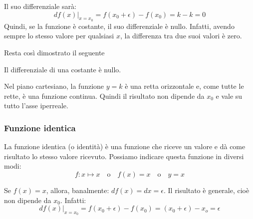 Il suo differenziale sarà:
\[df(x)|_{x=x_0}=f(x_0+\epsilon)-f(x_0)=k-k=0\]
Quindi, se la funzione è costante, il suo differenziale è nullo.
Infatti, avendo sempre lo stesso valore per qualsiasi \(x\), la differenza 
tra due suoi valori è zero. 

\begin{inaccessibleblock}
 \begin{center}
 \begin{minipage}[]{.38 \textwidth}
  \diffcostante
 \end{minipage} 
 \hfill
 \begin{minipage}[]{.58 \textwidth}
Resta così dimostrato il seguente   
\begin{teorema}
Il differenziale di una costante è nullo.
\end{teorema}
Nel piano cartesiano, la funzione  $y=k$ è una retta orizzontale e, come 
tutte le rette, è una funzione continua. Quindi il risultato non dipende da 
$x_0$ e vale su tutto l'asse iperreale.
 \end{minipage}
 \end{center}
\end{inaccessibleblock}

\label{fig:diff01_diffcostante}

\subsubsection{Funzione identica}
\label{subsubsec:diff01_diffidentica}

La funzione identica (o identità) è una funzione che riceve un valore e dà 
come risultato lo stesso valore ricevuto. Possiamo indicare questa funzione 
in diversi modi:
\[f: x \mapsto x \quad \text{o} \quad f(x)=x \quad \text{o} \quad y = x\]

Se $f(x)=x$, allora, banalmente: $df(x)=dx=\epsilon$. Il risultato è
generale, cioè non dipende da $x_0$. Infatti:\\
\[df(x)|_{x=x_0}=f(x_0+\epsilon)-f(x_0)=(x_0+\epsilon)-x_o=\epsilon\] 

